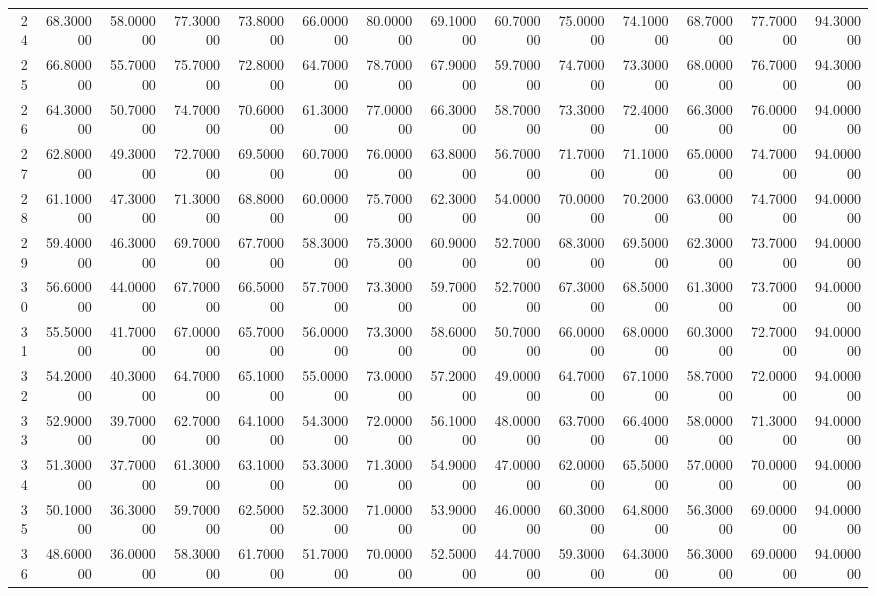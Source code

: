\begin{tabular}{rrrrrrrrrrrrrr}
24 & 68.300000 & 58.000000 & 77.300000 & 73.800000 & 66.000000 & 80.000000 & 69.100000 & 60.700000 & 75.000000 & 74.100000 & 68.700000 & 77.700000 & 94.300000 \\
25 & 66.800000 & 55.700000 & 75.700000 & 72.800000 & 64.700000 & 78.700000 & 67.900000 & 59.700000 & 74.700000 & 73.300000 & 68.000000 & 76.700000 & 94.300000 \\
26 & 64.300000 & 50.700000 & 74.700000 & 70.600000 & 61.300000 & 77.000000 & 66.300000 & 58.700000 & 73.300000 & 72.400000 & 66.300000 & 76.000000 & 94.000000 \\
27 & 62.800000 & 49.300000 & 72.700000 & 69.500000 & 60.700000 & 76.000000 & 63.800000 & 56.700000 & 71.700000 & 71.100000 & 65.000000 & 74.700000 & 94.000000 \\
28 & 61.100000 & 47.300000 & 71.300000 & 68.800000 & 60.000000 & 75.700000 & 62.300000 & 54.000000 & 70.000000 & 70.200000 & 63.000000 & 74.700000 & 94.000000 \\
29 & 59.400000 & 46.300000 & 69.700000 & 67.700000 & 58.300000 & 75.300000 & 60.900000 & 52.700000 & 68.300000 & 69.500000 & 62.300000 & 73.700000 & 94.000000 \\
30 & 56.600000 & 44.000000 & 67.700000 & 66.500000 & 57.700000 & 73.300000 & 59.700000 & 52.700000 & 67.300000 & 68.500000 & 61.300000 & 73.700000 & 94.000000 \\
31 & 55.500000 & 41.700000 & 67.000000 & 65.700000 & 56.000000 & 73.300000 & 58.600000 & 50.700000 & 66.000000 & 68.000000 & 60.300000 & 72.700000 & 94.000000 \\
32 & 54.200000 & 40.300000 & 64.700000 & 65.100000 & 55.000000 & 73.000000 & 57.200000 & 49.000000 & 64.700000 & 67.100000 & 58.700000 & 72.000000 & 94.000000 \\
33 & 52.900000 & 39.700000 & 62.700000 & 64.100000 & 54.300000 & 72.000000 & 56.100000 & 48.000000 & 63.700000 & 66.400000 & 58.000000 & 71.300000 & 94.000000 \\
34 & 51.300000 & 37.700000 & 61.300000 & 63.100000 & 53.300000 & 71.300000 & 54.900000 & 47.000000 & 62.000000 & 65.500000 & 57.000000 & 70.000000 & 94.000000 \\
35 & 50.100000 & 36.300000 & 59.700000 & 62.500000 & 52.300000 & 71.000000 & 53.900000 & 46.000000 & 60.300000 & 64.800000 & 56.300000 & 69.000000 & 94.000000 \\
36 & 48.600000 & 36.000000 & 58.300000 & 61.700000 & 51.700000 & 70.000000 & 52.500000 & 44.700000 & 59.300000 & 64.300000 & 56.300000 & 69.000000 & 94.000000 \\

\end{tabular}
